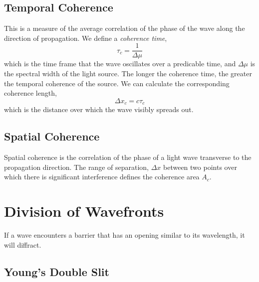 \documentclass{book}
\begin{document}
{\subsection{Temporal Coherence}
This is a measure of the average correlation of the phase of the wave along the direction of propagation. We define a \textit{coherence time},
\begin{equation}
	\tau_c = \frac{1}{\Delta \mu}
\end{equation}
which is the time frame that the wave oscillates over a predicable time, and $\Delta \mu$ is the spectral width of the light source. The longer the coherence time, the greater the temporal coherence of the source. We can calculate the corresponding coherence length,
\begin{equation}
	\Delta x_c = c\tau_c
\end{equation}
which is the distance over which the wave visibly spreads out.
\subsection{Spatial Coherence}
Spatial coherence is the correlation of the phase of a light wave transverse to the propagation direction. The range of separation, $\Delta x$ between two points over which there is significant interference defines the coherence area $A_c$. 
\section{Division of Wavefronts}
If a wave encounters a barrier that has an opening similar to its wavelength, it will diffract. 
\subsection{Young's Double Slit}
\begin{figure}[h]
	\centering 
	\begin{subfigure}{0.4\textwidth}
		\centering
\end{subfigure}
\end{figure}}
\end{document}
